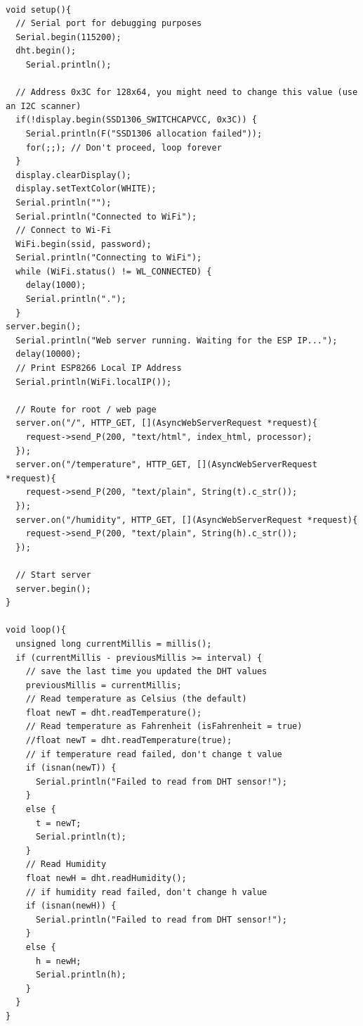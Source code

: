 \documentclass[12pt,a4paper,twocolumn,fleqn]{article}
\begin{document}
\begin{lstlisting}

void setup(){
  // Serial port for debugging purposes
  Serial.begin(115200);
  dht.begin();
    Serial.println();
  
  // Address 0x3C for 128x64, you might need to change this value (use an I2C scanner)
  if(!display.begin(SSD1306_SWITCHCAPVCC, 0x3C)) {
    Serial.println(F("SSD1306 allocation failed"));
    for(;;); // Don't proceed, loop forever
  }
  display.clearDisplay();
  display.setTextColor(WHITE);
  Serial.println("");
  Serial.println("Connected to WiFi"); 
  // Connect to Wi-Fi
  WiFi.begin(ssid, password);
  Serial.println("Connecting to WiFi");
  while (WiFi.status() != WL_CONNECTED) {
    delay(1000);
    Serial.println(".");
  }
server.begin();
  Serial.println("Web server running. Waiting for the ESP IP...");
  delay(10000);
  // Print ESP8266 Local IP Address
  Serial.println(WiFi.localIP());

  // Route for root / web page
  server.on("/", HTTP_GET, [](AsyncWebServerRequest *request){
    request->send_P(200, "text/html", index_html, processor);
  });
  server.on("/temperature", HTTP_GET, [](AsyncWebServerRequest *request){
    request->send_P(200, "text/plain", String(t).c_str());
  });
  server.on("/humidity", HTTP_GET, [](AsyncWebServerRequest *request){
    request->send_P(200, "text/plain", String(h).c_str());
  });

  // Start server
  server.begin();
}
 
void loop(){  
  unsigned long currentMillis = millis();
  if (currentMillis - previousMillis >= interval) {
    // save the last time you updated the DHT values
    previousMillis = currentMillis;
    // Read temperature as Celsius (the default)
    float newT = dht.readTemperature();
    // Read temperature as Fahrenheit (isFahrenheit = true)
    //float newT = dht.readTemperature(true);
    // if temperature read failed, don't change t value
    if (isnan(newT)) {
      Serial.println("Failed to read from DHT sensor!");
    }
    else {
      t = newT;
      Serial.println(t);
    }
    // Read Humidity
    float newH = dht.readHumidity();
    // if humidity read failed, don't change h value 
    if (isnan(newH)) {
      Serial.println("Failed to read from DHT sensor!");
    }
    else {
      h = newH;
      Serial.println(h);
    }
  }
}
\end{lstlisting}
\end{document}
